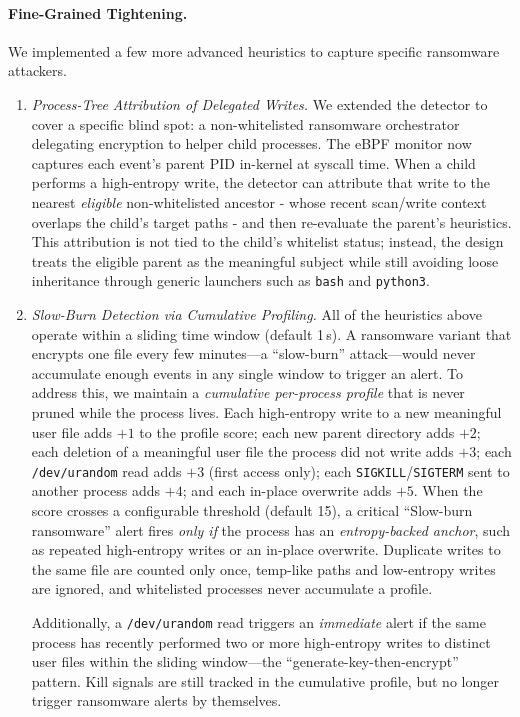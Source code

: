 \documentclass[twocolumn, 10pt]{scrartcl}
\begin{document}
\paragraph{Fine-Grained Tightening.}
We implemented a few more advanced heuristics to capture specific ransomware attackers.
\begin{enumerate}
    \item \textit{Process-Tree Attribution of Delegated Writes.}
    We extended the detector to cover a specific blind spot: a non-whitelisted ransomware orchestrator delegating encryption to helper child processes. The eBPF monitor now captures each event's parent PID in-kernel at syscall time. When a child performs a high-entropy write, the detector can attribute that write to the nearest \emph{eligible} non-whitelisted ancestor - whose recent scan/write context overlaps the child's target paths - and then re-evaluate the parent's heuristics. This attribution is not tied to the child's whitelist status; instead, the design treats the eligible parent as the meaningful subject while still avoiding loose inheritance through generic launchers such as \texttt{bash} and \texttt{python3}.

    \item \textit{Slow-Burn Detection via Cumulative Profiling.}
    All of the heuristics above operate within a sliding time window (default 1\,s). A ransomware variant that encrypts one file every few minutes---a ``slow-burn'' attack---would never accumulate enough events in any single window to trigger an alert. To address this, we maintain a \emph{cumulative per-process profile} that is never pruned while the process lives. Each high-entropy write to a new meaningful user file adds $+1$ to the profile score; each new parent directory adds $+2$; each deletion of a meaningful user file the process did not write adds $+3$; each \texttt{/dev/urandom} read adds $+3$ (first access only); each \texttt{SIGKILL}/\texttt{SIGTERM} sent to another process adds $+4$; and each in-place overwrite adds $+5$. When the score crosses a configurable threshold (default 15), a critical ``Slow-burn ransomware'' alert fires \emph{only if} the process has an \textit{entropy-backed anchor}, such as repeated high-entropy writes or an in-place overwrite. Duplicate writes to the same file are counted only once, temp-like paths and low-entropy writes are ignored, and whitelisted processes never accumulate a profile.
    
    Additionally, a \texttt{/dev/urandom} read triggers an \emph{immediate} alert if the same process has recently performed two or more high-entropy writes to distinct user files within the sliding window---the ``generate-key-then-encrypt'' pattern. Kill signals are still tracked in the cumulative profile, but no longer trigger ransomware alerts by themselves.

\end{enumerate}
\end{document}
